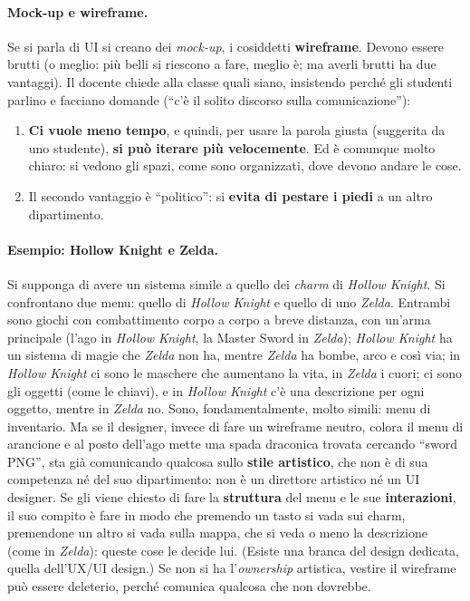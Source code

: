 \paragraph{Mock-up e wireframe.} Se si parla di UI si creano dei
\emph{mock-up}, i cosiddetti \textbf{wireframe}. Devono essere brutti (o
meglio: più belli si riescono a fare, meglio è; ma averli brutti ha due
vantaggi). Il docente chiede alla classe quali siano, insistendo perché gli
studenti parlino e facciano domande (``c'è il solito discorso sulla
comunicazione''):
\begin{enumerate}
  \item \textbf{Ci vuole meno tempo}, e quindi, per usare la parola giusta
        (suggerita da uno studente), \textbf{si può iterare più
        velocemente}. Ed è comunque molto chiaro: si vedono gli spazi, come
        sono organizzati, dove devono andare le cose.
  \item Il secondo vantaggio è ``politico'': si \textbf{evita di pestare i
        piedi} a un altro dipartimento.
\end{enumerate}

\paragraph{Esempio: Hollow Knight e Zelda.} Si supponga di avere un sistema
simile a quello dei \emph{charm} di \emph{Hollow Knight}. Si confrontano due
menu: quello di \emph{Hollow Knight} e quello di uno \emph{Zelda}. Entrambi
sono giochi con combattimento corpo a corpo a breve distanza, con un'arma
principale (l'ago in \emph{Hollow Knight}, la Master Sword in \emph{Zelda});
\emph{Hollow Knight} ha un sistema di magie che \emph{Zelda} non ha, mentre
\emph{Zelda} ha bombe, arco e così via; in \emph{Hollow Knight} ci sono le
maschere che aumentano la vita, in \emph{Zelda} i cuori; ci sono gli oggetti
(come le chiavi), e in \emph{Hollow Knight} c'è una descrizione per ogni
oggetto, mentre in \emph{Zelda} no. Sono, fondamentalmente, molto simili: menu
di inventario. Ma se il designer, invece di fare un wireframe neutro, colora il
menu di arancione e al posto dell'ago mette una spada draconica trovata
cercando ``sword PNG'', sta già comunicando qualcosa sullo \textbf{stile
artistico}, che non è di sua competenza né del suo dipartimento: non è un
direttore artistico né un UI designer. Se gli viene chiesto di fare la
\textbf{struttura} del menu e le sue \textbf{interazioni}, il suo compito è
fare in modo che premendo un tasto si vada sui charm, premendone un altro si
vada sulla mappa, che si veda o meno la descrizione (come in \emph{Zelda}):
queste cose le decide lui. (Esiste una branca del design dedicata, quella
dell'UX/UI design.) Se non si ha l'\emph{ownership} artistica, vestire il
wireframe può essere deleterio, perché comunica qualcosa che non dovrebbe.

